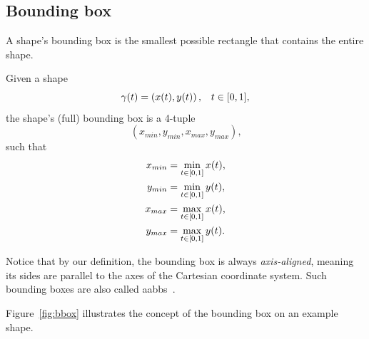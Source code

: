 \subsection{Bounding box}

A shape's bounding box is the smallest possible rectangle that contains the entire shape.

\begin{definition}
    Given a shape 
    \[
    \gamma(t) = \left(x(t), y(t)\right)\text{,}\quad t \in \interval[scaled]{0}{1}\text{,}
    \]
    the shape's (full) bounding box is a 4-tuple 
    \[
        \left(x_{min}, y_{min}, x_{max}, y_{max}\right)\text{,}
    \]
    such that
    \begin{align}
        x_{min} &= \min_{t \in \interval[scaled]{0}{1}}{x(t)}\text{,} \\
        y_{min} &= \min_{t \in \interval[scaled]{0}{1}}{y(t)}\text{,} \\
        x_{max} &= \max_{t \in \interval[scaled]{0}{1}}{x(t)}\text{,} \\
        y_{max} &= \max_{t \in \interval[scaled]{0}{1}}{y(t)}\text{.}
    \end{align}

    Notice that by our definition, the bounding box is always \emph{axis-aligned}, meaning its sides are parallel to the axes of the Cartesian coordinate system. Such bounding boxes are also called \glspl{aabb}~\cite{smartone2024boundingboxes}. 
    
    Figure~\ref{fig:bbox} illustrates the concept of the bounding box on an example shape.

    \begin{figure}[H]
        \centering

\end{figure}
\end{definition}
